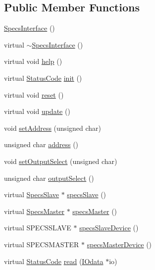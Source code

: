 \subsection*{Public Member Functions}
\begin{DoxyCompactItemize}
\item 
\hyperlink{classSpecsInterface_a33b267de6a6447965f068adea3aba138}{SpecsInterface} ()
\item 
virtual \hyperlink{classSpecsInterface_a914c632c299fa854be1ff9387b4d8939}{$\sim$SpecsInterface} ()
\item 
virtual void \hyperlink{classSpecsInterface_a24bf2b5e2da6c675ba5de3b226481a73}{help} ()
\item 
virtual \hyperlink{classStatusCode}{StatusCode} \hyperlink{classSpecsInterface_a99ec05cbe0d15892afbec6feaf33c89b}{init} ()
\item 
virtual void \hyperlink{classSpecsInterface_ade474eeef32f10c72926c9ba7d23f9a8}{reset} ()
\item 
virtual void \hyperlink{classSpecsInterface_af17ca5c8d48bea81f84e503b2994f5da}{update} ()
\item 
void \hyperlink{classSpecsInterface_aa92dff67cc80487ee3109b6aee2fa007}{setAddress} (unsigned char)
\item 
unsigned char \hyperlink{classSpecsInterface_a0fa039a15b842a5ba783ce825b9915d8}{address} ()
\item 
void \hyperlink{classSpecsInterface_a1907d360f2bda367cfb1d39e379c6493}{setOutputSelect} (unsigned char)
\item 
unsigned char \hyperlink{classSpecsInterface_ab291ed03f4c2f0143e14c26ad5f648dd}{outputSelect} ()
\item 
virtual \hyperlink{classSpecsSlave}{SpecsSlave} $\ast$ \hyperlink{classSpecsInterface_a13cf39bddfa8ba21d6e6aa78e78f0e4f}{specsSlave} ()
\item 
virtual \hyperlink{classSpecsMaster}{SpecsMaster} $\ast$ \hyperlink{classSpecsInterface_a3d497c965fb6ec06b49a54b7901a22b2}{specsMaster} ()
\item 
virtual SPECSSLAVE $\ast$ \hyperlink{classSpecsInterface_ac8d4711197f484f055533ec1e5ae01a1}{specsSlaveDevice} ()
\item 
virtual SPECSMASTER $\ast$ \hyperlink{classSpecsInterface_aa8aeaa74acf2c913905ea996d153a6ef}{specsMasterDevice} ()
\item 
virtual \hyperlink{classStatusCode}{StatusCode} \hyperlink{classSpecsInterface_a6f1c8ca420f08c8fca9347ca743087c5}{read} (\hyperlink{classIOdata}{IOdata} $\ast$io)

\end{DoxyCompactItemize}
